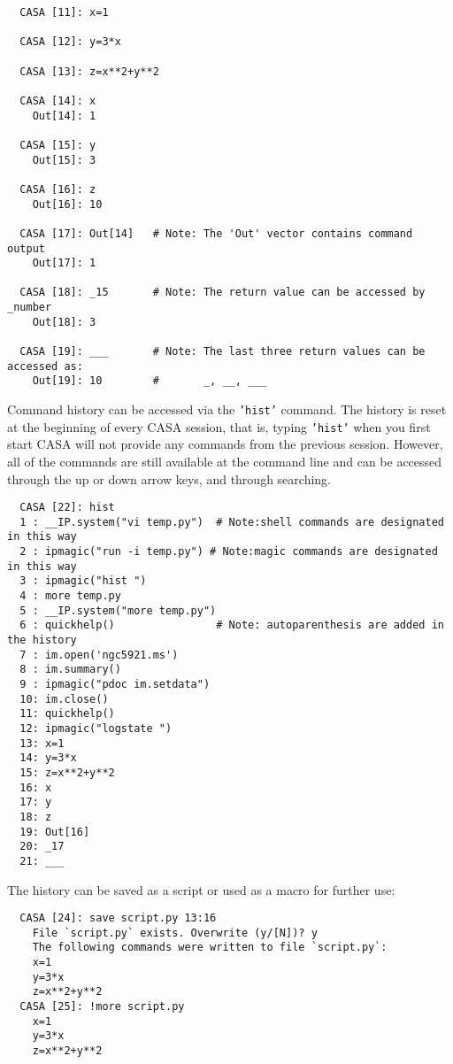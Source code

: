 \small
\begin{verbatim}
  CASA [11]: x=1

  CASA [12]: y=3*x

  CASA [13]: z=x**2+y**2

  CASA [14]: x
    Out[14]: 1

  CASA [15]: y
    Out[15]: 3

  CASA [16]: z
    Out[16]: 10

  CASA [17]: Out[14]   # Note: The 'Out' vector contains command output
    Out[17]: 1

  CASA [18]: _15       # Note: The return value can be accessed by _number
    Out[18]: 3

  CASA [19]: ___       # Note: The last three return values can be accessed as:
    Out[19]: 10        #       _, __, ___
\end{verbatim}
\normalsize

Command history can be accessed via the {\tt 'hist'} command. The history is
reset at the beginning of every CASA session, that is, typing {\tt 'hist'}
when you first start CASA will not provide any commands from the
previous session. However, all of the commands are still available at
the command line and can be accessed through the up or down arrow keys,
and through searching. 
\small
\begin{verbatim}
  CASA [22]: hist
  1 : __IP.system("vi temp.py")  # Note:shell commands are designated in this way
  2 : ipmagic("run -i temp.py") # Note:magic commands are designated in this way
  3 : ipmagic("hist ")
  4 : more temp.py
  5 : __IP.system("more temp.py")
  6 : quickhelp()                # Note: autoparenthesis are added in the history
  7 : im.open('ngc5921.ms')
  8 : im.summary()
  9 : ipmagic("pdoc im.setdata")
  10: im.close()
  11: quickhelp()
  12: ipmagic("logstate ")
  13: x=1
  14: y=3*x
  15: z=x**2+y**2
  16: x
  17: y
  18: z
  19: Out[16]
  20: _17
  21: ___
\end{verbatim}
\normalsize

The history can be saved as a script or used as a macro for further use:

\small
\begin{verbatim}
  CASA [24]: save script.py 13:16
    File `script.py` exists. Overwrite (y/[N])? y
    The following commands were written to file `script.py`:
    x=1
    y=3*x
    z=x**2+y**2
  CASA [25]: !more script.py
    x=1
    y=3*x
    z=x**2+y**2
\end{verbatim}
\normalsize

